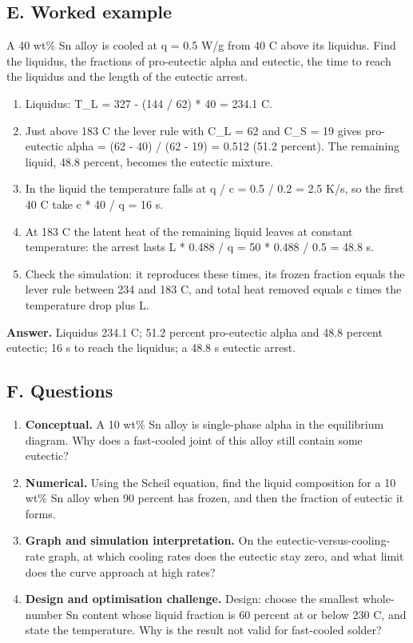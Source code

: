 \documentclass[11pt,a4paper]{article}
\begin{document}
\subsection*{E. Worked example}
A 40 wt\% Sn alloy is cooled at q = 0.5 W/g from 40 C above its liquidus. Find the liquidus, the fractions of pro-eutectic alpha and eutectic, the time to reach the liquidus and the length of the eutectic arrest.
\begin{enumerate}[nosep]
\item Liquidus: T\_L = 327 - (144 / 62) * 40 = 234.1 C.
\item Just above 183 C the lever rule with C\_L = 62 and C\_S = 19 gives pro-eutectic alpha = (62 - 40) / (62 - 19) = 0.512 (51.2 percent). The remaining liquid, 48.8 percent, becomes the eutectic mixture.
\item In the liquid the temperature falls at q / c = 0.5 / 0.2 = 2.5 K/s, so the first 40 C take c * 40 / q = 16 s.
\item At 183 C the latent heat of the remaining liquid leaves at constant temperature: the arrest lasts L * 0.488 / q = 50 * 0.488 / 0.5 = 48.8 s.
\item Check the simulation: it reproduces these times, its frozen fraction equals the lever rule between 234 and 183 C, and total heat removed equals c times the temperature drop plus L.
\end{enumerate}
\textbf{Answer.} Liquidus 234.1 C; 51.2 percent pro-eutectic alpha and 48.8 percent eutectic; 16 s to reach the liquidus; a 48.8 s eutectic arrest.

\subsection*{F. Questions}
\begin{enumerate}[nosep]
\item \textbf{Conceptual.} A 10 wt\% Sn alloy is single-phase alpha in the equilibrium diagram. Why does a fast-cooled joint of this alloy still contain some eutectic?
\item \textbf{Numerical.} Using the Scheil equation, find the liquid composition for a 10 wt\% Sn alloy when 90 percent has frozen, and then the fraction of eutectic it forms.
\item \textbf{Graph and simulation interpretation.} On the eutectic-versus-cooling-rate graph, at which cooling rates does the eutectic stay zero, and what limit does the curve approach at high rates?
\item \textbf{Design and optimisation challenge.} Design: choose the smallest whole-number Sn content whose liquid fraction is 60 percent at or below 230 C, and state the temperature. Why is the result not valid for fast-cooled solder?
\end{enumerate}
\end{document}
